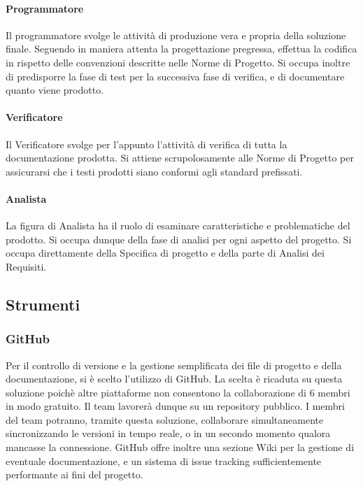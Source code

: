 \paragraph{Programmatore}
Il programmatore svolge le attività di produzione vera e propria della soluzione finale. Seguendo in maniera attenta la progettazione pregressa, effettua la codifica in rispetto delle convenzioni descritte nelle Norme di Progetto. Si occupa inoltre di predisporre la fase di test per la successiva fase di verifica, e di documentare quanto viene prodotto.

\paragraph{Verificatore}
Il Verificatore svolge per l'appunto l'attività di verifica di tutta la documentazione prodotta. Si attiene scrupolosamente alle Norme di Progetto per assicurarsi che i testi prodotti siano conformi agli standard prefissati.

\paragraph{Analista}
La figura di Analista ha il ruolo di esaminare caratteristiche e problematiche del prodotto. Si occupa dunque della fase di analisi per ogni aspetto del progetto. Si occupa direttamente della Specifica di progetto e della parte di Analisi dei Requisiti.

\subsection{Strumenti}

\subsubsection{GitHub}
Per il controllo di versione e la gestione semplificata dei file di progetto e della documentazione, si è scelto l'utilizzo di GitHub. La scelta è ricaduta su questa soluzione poichè altre piattaforme non consentono la collaborazione di 6 membri in modo gratuito. Il team lavorerà dunque su un repository pubblico. I membri del team potranno, tramite questa soluzione, collaborare simultaneamente sincronizzando le versioni in tempo reale, o in un secondo momento qualora mancasse la connessione. GitHub offre inoltre una sezione Wiki per la gestione di eventuale documentazione, e un sistema di issue tracking sufficientemente performante ai fini del progetto.

